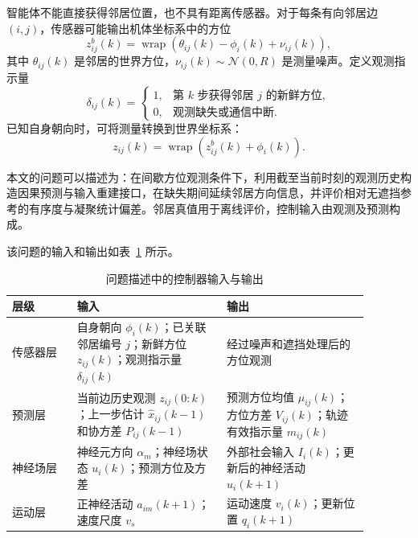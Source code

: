\documentclass[UTF8,fontset=windows,11pt]{ctexart}
\begin{document}
智能体不能直接获得邻居位置，也不具有距离传感器。对于每条有向邻居边 $(i,j)$，传感器可能输出机体坐标系中的方位
\begin{equation}
 z^b_{ij}(k)=
 \operatorname{wrap}\left(\theta_{ij}(k)-\phi_i(k)+\nu_{ij}(k)\right),
\end{equation}
其中 $\theta_{ij}(k)$ 是邻居的世界方位，$\nu_{ij}(k)\sim\mathcal N(0,R)$ 是测量噪声。定义观测指示量
\begin{equation}
 \delta_{ij}(k)=
 \begin{cases}
 1, & \text{第 $k$ 步获得邻居 $j$ 的新鲜方位},\\
 0, & \text{观测缺失或通信中断}.
 \end{cases}
\end{equation}
已知自身朝向时，可将测量转换到世界坐标系：
\begin{equation}
 z_{ij}(k)=\operatorname{wrap}(z^b_{ij}(k)+\phi_i(k)).
\end{equation}

本文的问题可以描述为：在间歇方位观测条件下，利用截至当前时刻的观测历史构造因果预测与输入重建接口，在缺失期间延续邻居方向信息，并评价相对无遮挡参考的有序度与凝聚统计偏差。邻居真值用于离线评价，控制输入由观测及预测构成。

该问题的输入和输出如表~\ref{tab:problem_io} 所示。

\begin{table}[!tbp]
 \centering
 \small
 \caption{问题描述中的控制器输入与输出}
 \label{tab:problem_io}
 \begin{tabular}{>{\raggedright\arraybackslash}p{0.16\linewidth}
                 >{\raggedright\arraybackslash}p{0.37\linewidth}
                 >{\raggedright\arraybackslash}p{0.35\linewidth}}
 \toprule
 层级 & 输入 & 输出\\
 \midrule
 传感器层 &
 自身朝向 $\phi_i(k)$；已关联邻居编号 $j$；新鲜方位 $z_{ij}(k)$；观测指示量 $\delta_{ij}(k)$ &
 经过噪声和遮挡处理后的方位观测\\
 预测层 &
 当前边历史观测 $z_{ij}(0:k)$；上一步估计 $\hat x_{ij}(k-1)$ 和协方差 $P_{ij}(k-1)$ &
 预测方位均值 $\mu_{ij}(k)$；方位方差 $V_{ij}(k)$；轨迹有效指示量 $m_{ij}(k)$\\
 神经场层 &
 神经元方向 $\alpha_m$；神经场状态 $u_i(k)$；预测方位及方差 &
 外部社会输入 $I_i(k)$；更新后的神经活动 $u_i(k+1)$\\
 运动层 &
 正神经活动 $a_{im}(k+1)$；速度尺度 $v_s$ &
 运动速度 $v_i(k)$；更新位置 $q_i(k+1)$\\
 \bottomrule
 \end{tabular}
\end{table}
\end{document}
